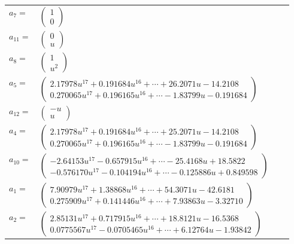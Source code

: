 \documentclass[1p]{elsarticle_modified}
\theoremstyle{definition}
\begin{document}
\begin{tabular}{m{7pt} m{180pt} m{7pt} m{180pt} }
\flushright $a_{7}=$&$\begin{pmatrix}1\\0\end{pmatrix}$ \\
\flushright $a_{11}=$&$\begin{pmatrix}0\\u\end{pmatrix}$ \\
\flushright $a_{8}=$&$\begin{pmatrix}1\\u^2\end{pmatrix}$ \\
\flushright $a_{5}=$&$\begin{pmatrix}2.17978 u^{17}+0.191684 u^{16}+\cdots+26.2071 u-14.2108\\0.270065 u^{17}+0.196165 u^{16}+\cdots-1.83799 u-0.191684\end{pmatrix}$ \\
\flushright $a_{12}=$&$\begin{pmatrix}- u\\u\end{pmatrix}$ \\
\flushright $a_{4}=$&$\begin{pmatrix}2.17978 u^{17}+0.191684 u^{16}+\cdots+25.2071 u-14.2108\\0.270065 u^{17}+0.196165 u^{16}+\cdots-1.83799 u-0.191684\end{pmatrix}$ \\
\flushright $a_{10}=$&$\begin{pmatrix}-2.64153 u^{17}-0.657915 u^{16}+\cdots-25.4168 u+18.5822\\-0.576170 u^{17}-0.104194 u^{16}+\cdots-0.125886 u+0.849598\end{pmatrix}$ \\
\flushright $a_{1}=$&$\begin{pmatrix}7.90979 u^{17}+1.38868 u^{16}+\cdots+54.3071 u-42.6181\\0.275909 u^{17}+0.141446 u^{16}+\cdots+7.93863 u-3.32710\end{pmatrix}$ \\
\flushright $a_{2}=$&$\begin{pmatrix}2.85131 u^{17}+0.717915 u^{16}+\cdots+18.8121 u-16.5368\\0.0775567 u^{17}-0.0705465 u^{16}+\cdots+6.12764 u-1.93842\end{pmatrix}$ \\

\end{tabular}
\end{document}
